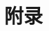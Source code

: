 \documentclass[lang=cn,11pt,a4paper,cite=authoryear]{elegantpaper}
\begin{document}
\begin{thebibliography}{99}
  
\end{thebibliography}

\clearpage
\section{附录}

\end{document}
